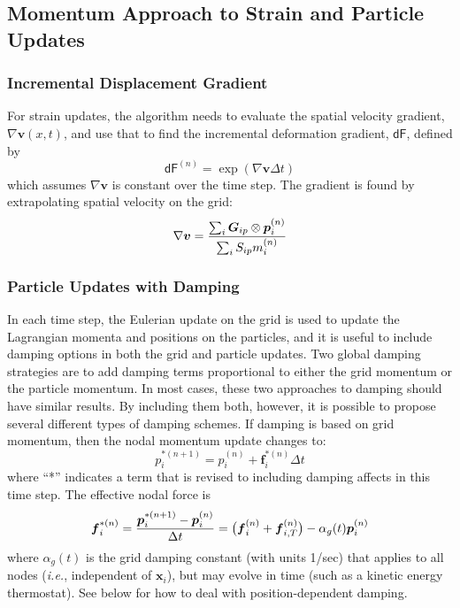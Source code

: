 \documentclass[11pt]{article}
\renewcommand{\vec}[1]{\boldsymbol{#1}}
\newcommand{\tens}[1]{\boldsymbol{\mathsf{#1}}}
\begin{document}
\subsection{Momentum Approach to Strain and Particle Updates}

\subsubsection{Incremental Displacement Gradient}

For strain updates, the algorithm needs to evaluate the spatial velocity gradient, $\nabla \vec v(x,t)$, and use that to find the incremental deformation gradient, $\tens{dF}$, defined by
\begin{equation}
     \tens{dF}^{(n)} = \exp(\nabla \vec v \Delta t)
\end{equation}
which assumes $\nabla \vec v$ is constant over the time step. The gradient is found by extrapolating spatial velocity on the grid:
\begin{equation}
    \nabla \vec v = {\sum_i \vec G_{ip} \otimes \vec p_i^{(n)}  \over \sum_i S_{ip} m_i^{(n)} }
\end{equation}

\subsubsection{Particle Updates with Damping}

In each time step, the Eulerian update on the grid is used to update the Lagrangian momenta and positions on the particles, and it is useful to include damping options in both the grid and particle updates. Two global damping strategies are to add damping terms proportional to either the grid momentum or the particle momentum. In most cases, these two approaches to damping should have similar results. By including them both, however, it is possible to propose several different types of damping schemes. If damping is based on grid momentum, then the nodal momentum update changes to:
\begin{equation}
     p_i^{*(n+1)} = p_i^{(n)} +  \vec f_i^{*(n)}\Delta t
\end{equation}
where ``*'' indicates a term that is revised to including damping affects in this time step. The effective nodal force is
\begin{equation}
    \vec f_i^{*(n)} = {\vec p_i^{*(n+1)}-\vec p_i^{(n)}\over \Delta t}
         =  \bigl(\vec f_{i}^{(n)} + \vec f_{i,T}^{(n)}\bigr) - \alpha_g(t)\vec p_i^{(n)} 
\end{equation}
where $\alpha_g(t)$ is the grid damping constant (with units 1/sec) that applies to all nodes (\emph{i.e.}, independent of $\vec x_i$), but may evolve in time (such as a kinetic energy thermostat). See below for how to deal with position-dependent damping.
\end{document}
